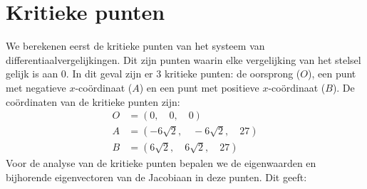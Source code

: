 \documentclass[12pt, a4paper]{article}
\theoremstyle{definition}
\begin{document}
\section{Kritieke punten}
We berekenen eerst de kritieke punten van het systeem van differentiaalvergelijkingen. Dit zijn punten waarin elke vergelijking van het stelsel gelijk is aan 0. In dit geval zijn er 3 kritieke punten: de oorsprong ($O$), een punt met negatieve $x$-coördinaat ($A$) en een punt met positieve $x$-coördinaat ($B$). De coördinaten van de kritieke punten zijn:
\begin{align*}
    O &= \left ( 0, \quad 0, \quad 0\right )\\
    A &= \left ( - 6 \sqrt{2}, \quad - 6 \sqrt{2}, \quad 27\right )\\
    B &= \left ( 6 \sqrt{2}, \quad 6 \sqrt{2}, \quad 27\right )
\end{align*}
Voor de analyse van de kritieke punten bepalen we de eigenwaarden en bijhorende eigenvectoren van de Jacobiaan in deze punten. Dit geeft:
\end{document}
